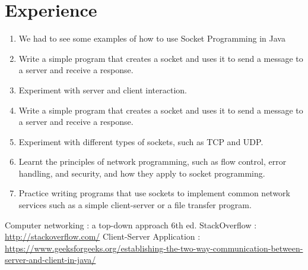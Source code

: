 \documentclass[11pt]{article}
\begin{document}
\section{Experience}
\begin{enumerate}
\item We had to see some examples of how to use Socket Programming in Java
\item Write a simple program that creates a socket and uses it to send a message to a server and receive a response. 
\item Experiment with server and client interaction.
\item Write a simple program that creates a socket and uses it to send a message to a server and receive a response. 
\item Experiment with different types of sockets, such as TCP and UDP.
\item Learnt the principles of network programming, such as flow control, error handling, and security, and how they apply to socket programming.
\item Practice writing programs that use sockets to implement common network services such as a simple client-server or a file transfer program.
\end{enumerate}

\begin{thebibliography}{1}
  Computer networking : a top-down approach 6th ed.
 StackOverflow : \url{http://stackoverflow.com/}
 Client-Server Application : 
\url{https://www.geeksforgeeks.org/establishing-the-two-way-communication-between-server-and-client-in-java/}
\end{thebibliography}
\end{document}
